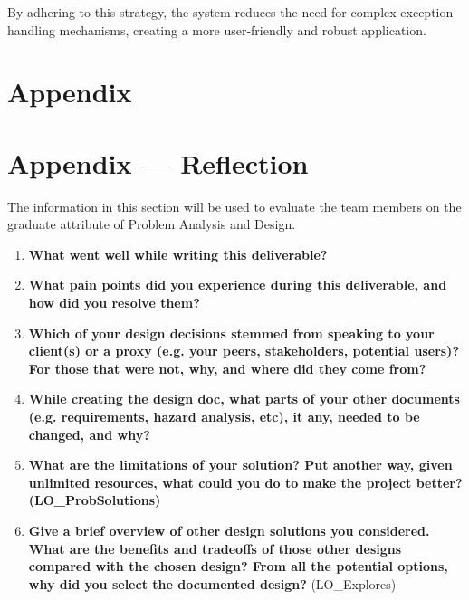 \documentclass[12pt, titlepage]{article}
\begin{document}
By adhering to this strategy, the system reduces the need for complex exception handling mechanisms, creating a more user-friendly and robust application.



\newpage{}

\section{Appendix} \label{Appendix}


\newpage{}

\section*{Appendix --- Reflection}


The information in this section will be used to evaluate the team members on the
graduate attribute of Problem Analysis and Design.



\begin{enumerate}
  \item \textbf{What went well while writing this deliverable?} \\

  \item \textbf{What pain points did you experience during this deliverable, and how
    did you resolve them?}
  \item \textbf{Which of your design decisions stemmed from speaking to your client(s)
  or a proxy (e.g. your peers, stakeholders, potential users)? For those that
  were not, why, and where did they come from?}
  \item \textbf{While creating the design doc, what parts of your other documents (e.g.
  requirements, hazard analysis, etc), it any, needed to be changed, and why?}
  \item \textbf{What are the limitations of your solution?  Put another way, given
  unlimited resources, what could you do to make the project better? (LO\_ProbSolutions)}
  \item \textbf{Give a brief overview of other design solutions you considered.  What
  are the benefits and tradeoffs of those other designs compared with the chosen
  design?  From all the potential options, why did you select the documented design?}
  (LO\_Explores)
\end{enumerate}
\end{document}
